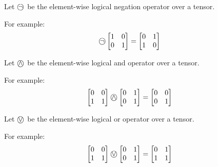 \begin{definition}
	Let $\incircbin{\neg}$ be the element-wise logical negation operator over a tensor.
	
	For example:
	\begin{align*}
		\incircbin{\neg}
		\begin{bmatrix}
		1&0\\
		0&1\\
		\end{bmatrix}&=
		\begin{bmatrix}
			0&1\\
			1&0\\
		\end{bmatrix}
	\end{align*}
\end{definition}

\begin{definition}
	Let $\incircbin{\land}$ be the element-wise logical and operator over a tensor.
	
	For example:
	\begin{align*}
	\begin{bmatrix}
	0&0\\
	1&1\\
	\end{bmatrix}
	\incircbin{\land}
	\begin{bmatrix}
	0&1\\
	0&1\\
	\end{bmatrix}
	&=
	\begin{bmatrix}
	0&0\\
	0&1\\
	\end{bmatrix}
	\end{align*}
\end{definition}

\begin{definition}
	Let $\incircbin{\lor}$ be the element-wise logical or operator over a tensor.
	
	For example:
	\begin{align*}
	\begin{bmatrix}
	0&0\\
	1&1\\
	\end{bmatrix}
	\incircbin{\lor}
	\begin{bmatrix}
	0&1\\
	0&1\\
	\end{bmatrix}
	&=
	\begin{bmatrix}
	0&1\\
	1&1\\
	\end{bmatrix}
	\end{align*}
\end{definition}

